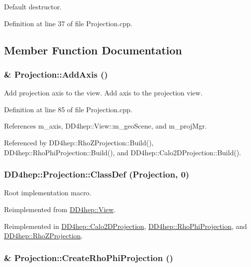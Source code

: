 Default destructor. 

Definition at line 37 of file Projection.cpp.

\subsection{Member Function Documentation}
\hypertarget{class_d_d4hep_1_1_projection_a06d9f151c2e689580f04967905bd97b8}{
\subsubsection[{AddAxis}]{ \& Projection::AddAxis ()}}
\label{class_d_d4hep_1_1_projection_a06d9f151c2e689580f04967905bd97b8}


Add projection axis to the view. Add axis to the projection view. 

Definition at line 85 of file Projection.cpp.

References m\_\-axis, DD4hep::View::m\_\-geoScene, and m\_\-projMgr.

Referenced by DD4hep::RhoZProjection::Build(), DD4hep::RhoPhiProjection::Build(), and DD4hep::Calo2DProjection::Build().\hypertarget{class_d_d4hep_1_1_projection_a32d78dc00500fcb000ce25052c96fd62}{
\subsubsection[{ClassDef}]{\setlength{\rightskip}{0pt plus 5cm}DD4hep::Projection::ClassDef ({\bf Projection}, \/  0)}}
\label{class_d_d4hep_1_1_projection_a32d78dc00500fcb000ce25052c96fd62}


Root implementation macro. 

Reimplemented from \hyperlink{class_d_d4hep_1_1_view_a35dcb8a29c90f0adeba81ad4215be551}{DD4hep::View}.

Reimplemented in \hyperlink{class_d_d4hep_1_1_calo2_d_projection_a27b84375acec854d3c3fedba3519b7f4}{DD4hep::Calo2DProjection}, \hyperlink{class_d_d4hep_1_1_rho_phi_projection_a33fb99400480c317f4e4d9fabf48836c}{DD4hep::RhoPhiProjection}, and \hyperlink{class_d_d4hep_1_1_rho_z_projection_aef14a29e5037f6ac2df7eb09a8fa6c84}{DD4hep::RhoZProjection}.\hypertarget{class_d_d4hep_1_1_projection_aa2e3b7e69527aca46f8531e4fc523f1f}{
\subsubsection[{CreateRhoPhiProjection}]{ \& Projection::CreateRhoPhiProjection ()}}
\label{class_d_d4hep_1_1_projection_aa2e3b7e69527aca46f8531e4fc523f1f}


